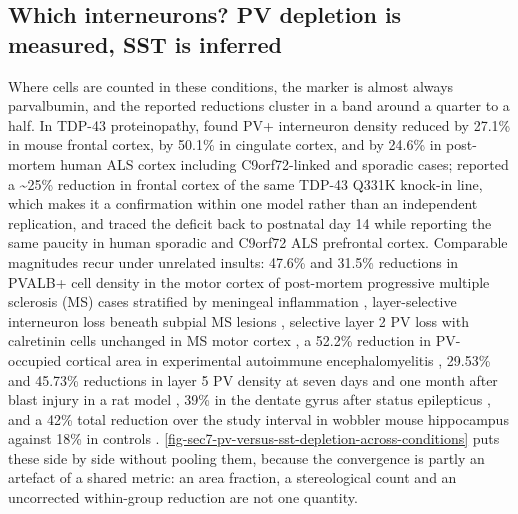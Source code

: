 \documentclass[11pt]{article}
\begin{document}
\subsection{Which interneurons? PV depletion is measured, SST is inferred}
\label{sec-07-pv-versus-sst}

Where cells are counted in these conditions, the marker is almost always parvalbumin, and the reported reductions cluster in a band around a quarter to a half. In TDP-43 proteinopathy, \citet{Lin2021} found PV+ interneuron density reduced by 27.1\% in mouse frontal cortex, by 50.1\% in cingulate cortex, and by 24.6\% in post-mortem human ALS cortex including C9orf72-linked and sporadic cases; \citet{White2018} reported a \textasciitilde{}25\% reduction in frontal cortex of the same TDP-43 Q331K knock-in line, which makes it a confirmation within one model rather than an independent replication, and \citet{Lin2020} traced the deficit back to postnatal day 14 while reporting the same paucity in human sporadic and C9orf72 ALS prefrontal cortex. Comparable magnitudes recur under unrelated insults: 47.6\% and 31.5\% reductions in PVALB+ cell density in the motor cortex of post-mortem progressive multiple sclerosis (MS) cases stratified by meningeal inflammation \citep{Magliozzi2021}, layer-selective interneuron loss beneath subpial MS lesions \citep{Nicholas2015}, selective layer 2 PV loss with calretinin cells unchanged in MS motor cortex \citep{Clements2008}, a 52.2\% reduction in PV-occupied cortical area in experimental autoimmune encephalomyelitis \citep{Falco2014}, 29.53\% and 45.73\% reductions in layer 5 PV density at seven days and one month after blast injury in a rat model \citep{May2024}, 39\% in the dentate gyrus after status epilepticus \citep{Mishra2015}, and a 42\% total reduction over the study interval in wobbler mouse hippocampus against 18\% in controls \citep{Thielsen2013}. \ref{fig-sec7-pv-versus-sst-depletion-across-conditions} puts these side by side without pooling them, because the convergence is partly an artefact of a shared metric: an area fraction, a stereological count and an uncorrected within-group reduction are not one quantity.
\end{document}

